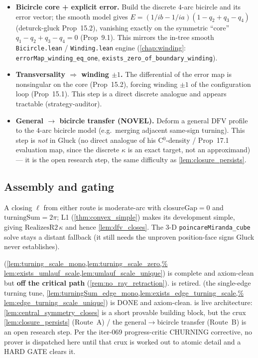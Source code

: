 \begin{itemize}
  \item \textbf{Bicircle core + explicit error.} Build the discrete $4$-arc
    bicircle and its error vector; the smooth model gives
    $E = (1/ib - 1/ia)(1 - q_2 + q_3 - q_4)$ (deturck-gluck Prop~15.2), vanishing
    exactly on the symmetric ``core'' $q_1 - q_2 + q_3 - q_4 = 0$ (Prop~9.1).
    This mirrors the in-tree smooth \texttt{Bicircle.lean} / \texttt{Winding.lean}
    engine (\cref{chap:winding}: \texttt{errorMap\_winding\_eq\_one},
    \texttt{exists\_zero\_of\_boundary\_winding}).
  \item \textbf{Transversality $\Rightarrow$ winding $\pm 1$.} The differential of
    the error map is nonsingular on the core (Prop~15.2), forcing winding $\pm 1$
    of the configuration loop (Prop~15.1). This step is a direct discrete analogue
    and appears tractable (strategy-auditor).
  \item \textbf{General $\to$ bicircle transfer (NOVEL).} Deform a general
    $\mathrm{DFV}$ profile to the $4$-arc bicircle model (e.g.\ merging
    adjacent same-sign turning). This step is \emph{not} in Gluck (no direct
    analogue of his C$^0$-density / Prop~17.1 evaluation map, since the discrete
    $\kappa$ is an exact target, not an approximand) --- it is the open research
    step, the same difficulty as \cref{lem:closure_persists}.
\end{itemize}

\subsection*{Assembly and gating}

A closing $\ell$ from either route is moderate-arc with
$\mathrm{closureGap} = 0$ and $\mathrm{turningSum} = 2\pi$; L1
(\cref{thm:convex_simple}) makes its development simple, giving
$\mathrm{RealizesR2}\,\kappa$ and hence \cref{lem:dfv_closes}. The $3$-D
\texttt{poincareMiranda\_cube} solve stays a distant fallback (it still needs the
unproven position-face signs Gluck never establishes).

\begin{remark}
   (\cref{lem:turning_scale_mono,lem:turning_scale_zero,%
  lem:exists_umlauf_scale,lem:umlauf_scale_unique}) is complete and axiom-clean
  but \textbf{off the critical path} (\cref{rem:no_ray_retraction}).
   is retired.  (the single-edge turning
  tune, \cref{lem:turningSum_edge_mono,lem:exists_edge_turning_scale,%
  lem:edge_turning_scale_unique}) is DONE and axiom-clean.  is
  live architecture: \cref{lem:central_symmetry_closes} is a short provable
  building block, but the crux \cref{lem:closure_persists} (Route~A) / the
  general$\to$bicircle transfer (Route~B) is an open research step. Per the
  iter-069 progress-critic CHURNING corrective, no prover is dispatched here until
  that crux is worked out to atomic detail and a HARD GATE clears it.
\end{remark}
